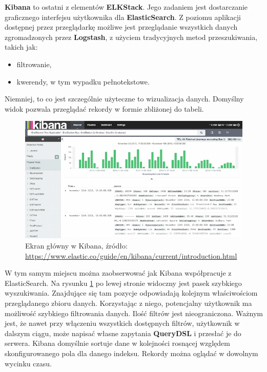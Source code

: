     \textbf{Kibana} to ostatni z elementów \textbf{ELKStack}. Jego zadaniem jest dostarczanie graficznego interfejsu
    użytkownika dla \textbf{ElasticSearch}. Z poziomu aplikacji dostępnej przez przeglądarkę możliwe
    jest przeglądanie wszystkich danych zgromadzonych przez \textbf{Logstash}, z użyciem tradycyjnych
    metod przeszukiwania, takich jak:
    \begin{itemize}
        \item filtrowanie,
        \item kwerendy, w tym wypadku pełnotekstowe.
    \end{itemize}
    
    Niemniej, to co jest szczególnie użyteczne to wizualizacja danych. Domyślny widok pozwala przeglądać 
    rekordy w formie zbliżonej do tabeli. 
    \begin{figure}[h]
        \centering
        \includegraphics[width=1.0\textwidth]{images/kibana_main_view}
        \caption[Ekran główny w Kibana]{
            Ekran główny w Kibana, źródło: \url{https://www.elastic.co/guide/en/kibana/current/introduction.html}
        }
        \label{chapter:application:elkstack:kibana:main_view}
    \end{figure}
    W tym samym miejscu można zaobserwować jak Kibana współpracuje z ElasticSearch. Na rysunku \ref{chapter:application:elkstack:kibana:main_view} po lewej stronie widoczny jest pasek szybkiego
    wyszukiwania. Znajdujące się tam pozycje odpowiadają kolejnym właściwościom przeglądanego zbioru danych.
    Korzystając z niego, potencjalny użytkownik ma możliwość szybkiego filtrowania danych. Ilość filtrów jest
    nieograniczona. Ważnym jest, że nawet przy włączeniu wszystkich dostępnych filtrów, użytkownik w dalszym ciągu, może napisać
    własne zapytania \textbf{QueryDSL} i przesłać je do serwera. Kibana domyślnie sortuje dane w kolejności
    rosnącej względem skonfigurowanego pola dla danego indeksu. Rekordy można oglądać w dowolnym wycinku czasu.
    
